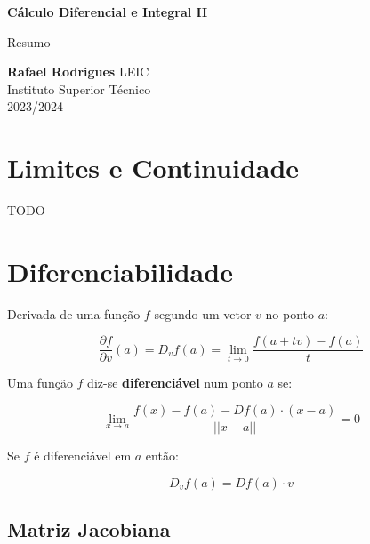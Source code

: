 \documentclass[11pt, a4paper]{article}
\begin{document}
\begin{titlepage}
    \begin{center}
        \vspace*{5cm}

        \textbf{\LARGE Cálculo Diferencial e Integral II}
        \vspace{1cm}

        \Large Resumo
        \vspace{2cm}

        \textbf{Rafael Rodrigues}
        \vfill
        LEIC \\
        Instituto Superior Técnico \\
        2023/2024
    \end{center}
\end{titlepage}

\tableofcontents

\setcounter{section}{1}

\newpage
\section{Limites e Continuidade}

TODO

\section{Diferenciabilidade}

Derivada de uma função $f$ segundo um vetor $v$ no ponto $a$:

\begin{equation*}
    \frac{\partial f}{\partial v}(a) = D_vf(a) =
    \lim_{t \to 0} \frac{f(a + tv) - f(a)}{t}
\end{equation*}

Uma função $f$ diz-se \textbf{diferenciável} num ponto $a$ se:

\begin{equation*}
    \lim_{x \to a} \frac{f(x) - f(a) - Df(a) \cdot (x - a)}{||x - a||} = 0
\end{equation*}

Se $f$ é diferenciável em $a$ então:

\begin{equation*}
    D_vf(a) = Df(a) \cdot v
\end{equation*}

\subsection{Matriz Jacobiana}
\end{document}
